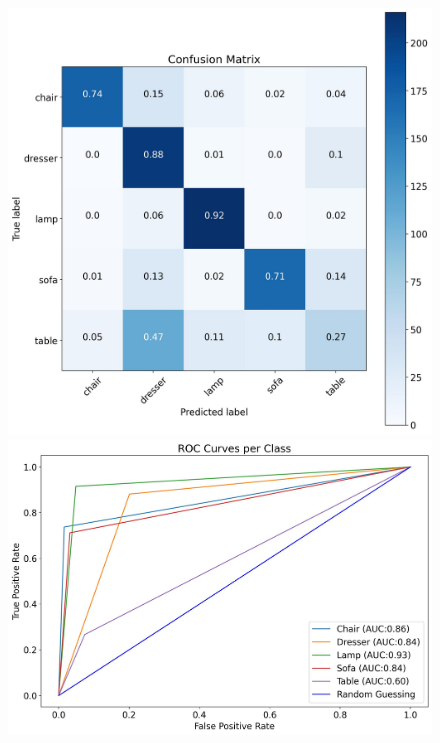 \documentclass[11pt,a4paper]{article}
\begin{document}
\begin{figure}[H]
{{    \includegraphics[scale=0.13]{imgs/experiments/images/11/Experiment-11-TESTING-confusion-matrix.jpg}
    \includegraphics[scale=0.13]{imgs/experiments/images/11/Experiment-11-TESTING-ROC.jpg}
    }}
    \qquad
\end{figure}
\end{document}

